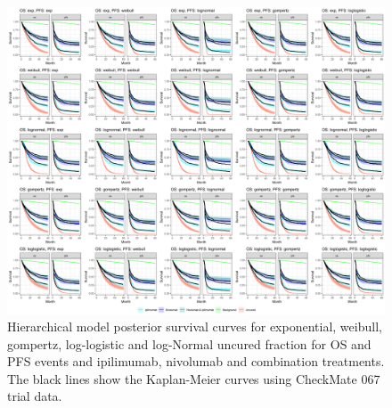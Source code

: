 \documentclass[AMA,STIX1COL]{WileyNJD-v2}
\begin{document}
\begin{figure}
\centering
\includegraphics[width=0.9\linewidth]{plot_S_grid_cf_hier.png}
\caption{\label{fig:S_grid_cf_hier} Hierarchical model posterior survival curves for exponential, weibull, gompertz, log-logistic and log-Normal uncured fraction for OS and PFS events and ipilimumab, nivolumab and combination treatments. The black lines show the Kaplan-Meier curves using CheckMate 067 trial data.}
\end{figure}


\end{document}
